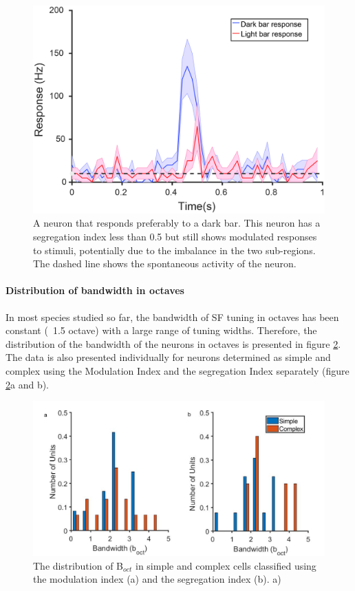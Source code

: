 		\begin{figure}[H]
		
		\includegraphics[width=\linewidth]{LinearV1/concneurons.jpg}
		\caption{A neuron that responds preferably to a dark bar. This neuron has a segregation index less than 0.5 but still shows modulated responses to stimuli, potentially due to the imbalance in the two sub-regions. The dashed line shows the spontaneous activity of the neuron.}
		\label{fig:conc}
	\end{figure}

	\paragraph{Distribution of bandwidth in octaves}
	
	In most species studied so far, the bandwidth of SF tuning in octaves has been constant (~1.5 octave) with a large range of tuning widths. Therefore, the distribution of the bandwidth of the neurons in octaves is presented in figure \ref{fig:boct}. The data is also presented individually for neurons determined as simple and complex using the Modulation Index and the segregation Index separately (figure \ref{fig:boct}a and b).

		\begin{figure}[H]
		
		\includegraphics[width=\linewidth]{LinearV1/boct.jpg}
		\caption{The distribution of B$_{oct}$ in simple and complex cells classified using the modulation index (a) and the segregation index (b). a) }
		\label{fig:boct}
		
		\end{figure}
	
